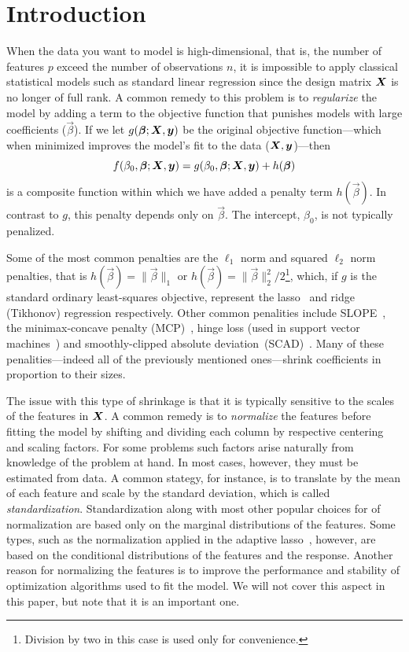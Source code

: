\section{Introduction}

When the data you want to model is high-dimensional, that is, the number of features \(p\)
exceed the number of observations \(n\), it is impossible to apply classical statistical
models such as standard linear regression since the design matrix \(\boldsymbol X\) is no longer
of full rank. A common remedy to this problem is to \emph{regularize} the model by adding a
term to the objective function that punishes models with large coefficients
(\(\vec\beta\)). If we let \(g(\boldsymbol\beta; \boldsymbol X, \boldsymbol y)\) be the original objective
function---which when minimized improves the model's fit to the data (\(\boldsymbol X, \boldsymbol
y\))---then
\begin{equation}
  \label{eq:general-objective}
  f(\beta_0, \boldsymbol\beta; \boldsymbol X, \boldsymbol y) = g(\beta_0, \boldsymbol\beta; \boldsymbol X, \boldsymbol y) + h(\boldsymbol\beta)
\end{equation}
is a composite function within which we have added a penalty term \(h(\vec\beta)\). In
contrast to \(g\), this penalty depends only on \(\vec{\beta}\). The intercept,
\(\beta_0\), is not typically penalized.

Some of the most common penalties are the \(\ell_1\) norm and squared \(\ell_2\) norm
penalties, that is \(h(\vec\beta) = \lVert \vec\beta \rVert_1\) or \(h(\vec\beta) = \lVert
\vec\beta \rVert_2^2/2\)\footnote{Division by two in this case is used only for
  convenience.}, which, if \(g\) is the standard ordinary least-squares objective, represent
the lasso~\citep{tibshirani1996,santosa1986,donoho1994} and ridge (Tikhonov) regression
respectively. Other common penalities include SLOPE~\citep{bogdan2013,bogdan2015}, the
minimax-concave penalty (MCP)~\citep{zhang2010}, hinge loss (used in support vector
machines~\citep{cortes1995}) and smoothly-clipped absolute
deviation~(SCAD)~\citep{fan2001}. Many of these penalities---indeed all of the previously
mentioned ones---shrink coefficients in proportion to their sizes.

The issue with this type of shrinkage is that it is typically sensitive to the scales of
the features in \(\boldsymbol X\). A common remedy is to \emph{normalize} the features before
fitting the model by shifting and dividing each column by respective centering and scaling
factors. For some problems such factors arise naturally from knowledge of the problem at
hand. In most cases, however, they must be estimated from data. A common stategy, for
instance, is to translate by the mean of each feature and scale by the standard deviation,
which is called \emph{standardization}. Standardization along with most other popular
choices for of normalization are based only on the marginal distributions of the features.
Some types, such as the normalization applied in the adaptive lasso~\citep{zou2006},
however, are based on the conditional distributions of the features and the response.
Another reason for normalizing the features is to improve the performance and stability of
optimization algorithms used to fit the model. We will not cover this aspect in this paper,
but note that it is an important one.

